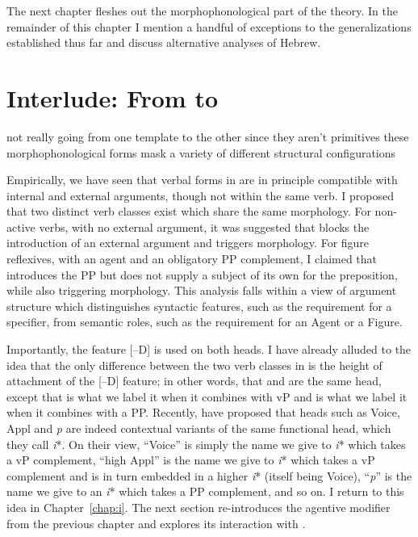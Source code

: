 The next chapter fleshes out the morphophonological part of the theory. In the remainder of this chapter I mention a handful of exceptions to the generalizations established thus far and discuss alternative analyses of Hebrew.



\section{Interlude: From {\tnif} to {\thif}} \label{vz:interim}
not really going from one template to the other since they aren't primitives
these morphophonological forms mask a variety of different structural configurations


Empirically, we have seen that verbal forms in {\tnif} are in principle compatible with internal and external arguments, though not within the same verb. I proposed that two distinct verb classes exist which share the same morphology. For non-active verbs, with no external argument, it was suggested that {\vz} blocks the introduction of an external argument and triggers {\tnif} morphology. For figure reflexives, with an agent and an obligatory PP complement, I claimed that {\pz} introduces the PP but does not supply a subject of its own for the preposition, while also triggering {\tnif} morphology. This analysis falls within a view of argument structure which distinguishes syntactic features, such as the requirement for a specifier, from semantic roles, such as the requirement for an Agent or a Figure.

Importantly, the feature [--D] is used on both heads. I have already alluded to the idea that the only difference between the two verb classes in {\tnif} is the height of attachment of the [--D] feature; in other words, that {\vz} and {\pz} are the same head, except that {\vz} is what we label it when it combines with vP and {\pz} is what we label it when it combines with a PP. Recently, \cite{woodmarantz17} have proposed that heads such as Voice, Appl and \emph{p} are indeed contextual variants of the same functional head, which they call \emph{i}*. On their view, ``Voice'' is simply the name we give to \emph{i}* which takes a vP complement, ``high Appl'' is the name we give to \emph{i}* which takes a vP complement and is in turn embedded in a higher \emph{i}* (itself being Voice), ``\emph{p}'' is the name we give to an \emph{i}* which takes a PP complement, and so on. I return to this idea in Chapter~\ref{chap:i}. The next section re-introduces the agentive modifier {\va} from the previous chapter and explores its interaction with {\vz}.


